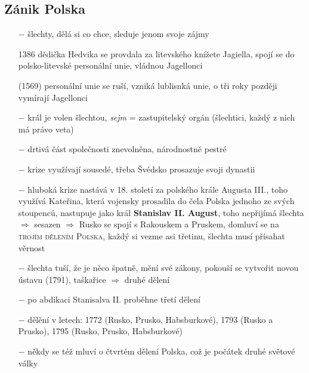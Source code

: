 \documentclass{article}
\begin{document}
\subsection*{Zánik Polska}
\begin{itemize}
    \vspace{-0.5em}
    \setlength\itemsep{0.15em}
    \item[$-$]  šlechty, dělá si co chce, sleduje jenom svoje zájmy
    \item[1386] dědička Hedvika se provdala za litevského knížete Jagiella, spojí se do polsko-litevské personální unie, vládnou Jagellonci
    \item[(1569)] personální unie se ruší, vzniká lublisnká unie, o tři roky později vymírají Jagellonci
    \item[$-$] král je volen šlechtou, \textit{sejm} = zastupitelský orgán (šlechtici, každý z nich má právo veta)
    \item[$-$] drtivá část společnosti znevolněna, národnostně pestré
    \item[$-$] krize využívají sousedé, třeba Švédsko prosazuje svoji dynastii
    \item[$-$] hluboká krize nastává v 18. století za polského krále Augusta III., toho využívá Kateřina, která vojensky prosadila do čela Polska jednoho ze svých stoupenců, nastupuje jako král \textbf{Stanislav II. August}, toho nepřijímá šlechta $\Rightarrow$ sesazen $\Rightarrow$ Rusko se spojí s Rakouskem a Pruskem, domluví se na \textsc{trojím dělením Polska}, každý si vezme asi třetinu, šlechta musí přísahat věrnost
    \item[$-$] šlechta tuší, že je něco špatně, mění své zákony, pokouší se vytvořit novou ústavu (1791), taškařice $\Rightarrow$ druhé dělení
    \item[$-$] po abdikaci Stanisalva II. proběhne třetí dělení
    \item[$-$] dělění v letech: 1772 (Rusko, Prusko, Habsburkové), 1793 (Rusko a Prusko), 1795 (Rusko, Prusko, Habsburkové)
    \item[$-$] někdy se též mluví o čtvrtém dělení Polska, což je počátek druhé světové války
\end{itemize}
\end{document}
